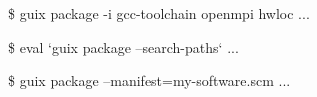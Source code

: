 \documentclass{beamer}
\begin{document}
\begin{frame}[fragile]

  \begin{semiverbatim}
\$ guix package -i gcc-toolchain openmpi hwloc
\textrm{...}

\$ eval `guix package --search-paths`
\textrm{...}

\$ guix package --manifest=my-software.scm
\textrm{...}
  \end{semiverbatim}

\end{frame}


\end{document}
